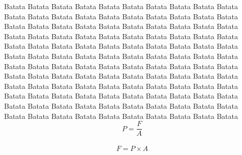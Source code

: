 \begin{flushright}
    Batata Batata Batata Batata Batata Batata Batata Batata Batata Batata Batata Batata 
    Batata Batata Batata Batata Batata Batata Batata Batata Batata Batata Batata Batata 
    Batata Batata Batata Batata Batata Batata Batata Batata Batata Batata Batata Batata 
    Batata Batata Batata Batata Batata Batata Batata Batata Batata Batata Batata Batata 
    Batata Batata Batata Batata Batata Batata Batata Batata Batata Batata Batata Batata 
    Batata Batata Batata Batata Batata Batata Batata Batata Batata Batata Batata Batata 
    Batata Batata Batata Batata Batata Batata Batata Batata Batata Batata Batata Batata 
    Batata Batata Batata Batata Batata Batata Batata Batata Batata Batata Batata Batata 
    Batata Batata Batata Batata Batata Batata Batata Batata Batata Batata Batata Batata 
    Batata Batata Batata Batata Batata Batata Batata Batata Batata Batata Batata Batata \\

    \begin{equation}
        P = \frac{F}{A} 
    \end{equation}\\

    \begin{equation}
        F = P \times A
    \end{equation}\\

\end{flushright}